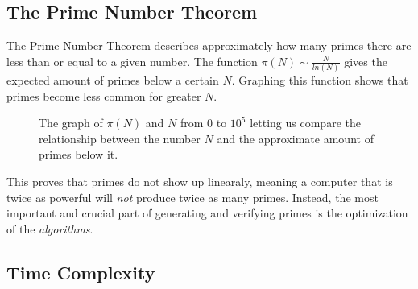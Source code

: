 \documentclass[main.tex]{subfiles}
\begin{document}
\subsection{The Prime Number Theorem}
The Prime Number Theorem \cite{theorem:prime_num} describes approximately how many primes there are less than or equal to a given number. The function $\pi(N) \sim \frac{N}{ln(N)}$ gives the expected amount of primes below a certain $N$. Graphing this function shows that primes become less common for greater $N$.

\begin{figure}[ht]
    \begin{center}
    \end{center}
\caption{The graph of $\pi(N)$ and $N$ from $0$ to $10^{5}$ letting us compare the relationship between the number $N$ and the approximate amount of primes below it.}
\end{figure}

This proves that primes do not show up linearaly, meaning a computer that is twice as powerful will \textit{not} produce twice as many primes. Instead, the most important and crucial part of generating and verifying primes is the optimization of the \textit{algorithms}.

\subsection{Time Complexity}
\end{document}
